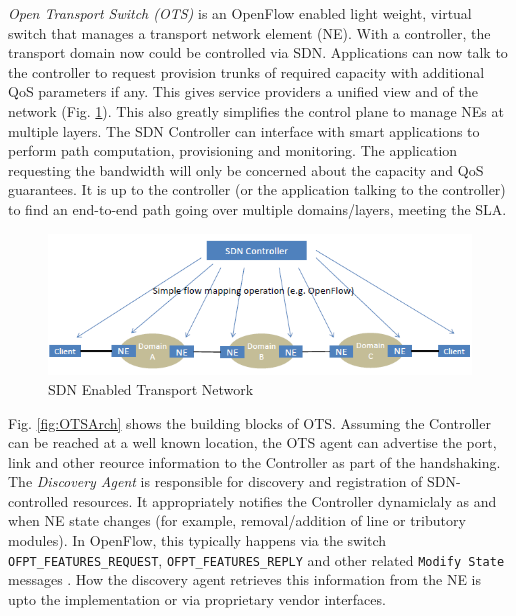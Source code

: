 \documentclass{sig-alternate-10pt}
\begin{document}
	\textit{Open Transport Switch (OTS)} is an OpenFlow \cite{OF1.0} enabled light weight, virtual switch
	that manages a transport network element (NE). With a controller, the transport domain now could be
	controlled via SDN. Applications can now talk to the controller to request provision trunks of required
	capacity with additional QoS parameters if any. This gives service providers a unified view and of the
	network (Fig. \ref{fig:MLwOF}). This also greatly simplifies the control plane to manage NEs at multiple
	layers. The SDN Controller can interface with smart applications to perform path computation,
	provisioning and monitoring. The application requesting the bandwidth will only be concerned about the
	capacity and QoS guarantees. It is up to the controller (or the application talking to the controller) to
	find an end-to-end path going over multiple domains/layers, meeting the SLA.

	\begin{figure}[htb]
	\centering
	\includegraphics[scale=0.50]{MLwOF.png}
	\caption{SDN Enabled Transport Network}
	\label{fig:MLwOF}
	\end{figure}

	Fig. \ref{fig:OTSArch} shows the building blocks of OTS. Assuming the Controller can be reached at a well
	known location, the OTS agent can advertise the port, link and other reource information to the
	Controller as part of the handshaking. The \textit{Discovery Agent} is responsible for discovery and
	registration of SDN-controlled resources. It appropriately notifies the Controller dynamiclaly as and
	when NE state changes (for example, removal/addition of line or tributory modules). In OpenFlow, this
	typically happens via the switch \texttt{OFPT\_FEATURES\_REQUEST}, \texttt{OFPT\_FEATURES\_REPLY} and
	other related \texttt{Modify State} messages \cite{OF1.0}. How the discovery agent retrieves this
	information from the NE is upto the implementation or via proprietary vendor interfaces. \\
	
\end{document}
